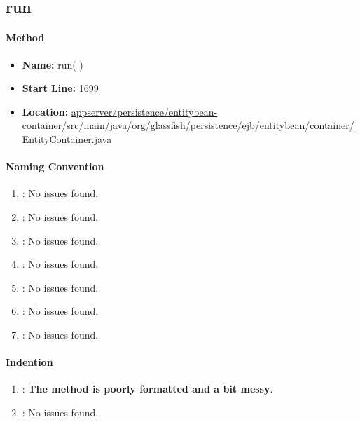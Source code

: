 \subsection{run} %
\label{sub:preinvokenotx}


\paragraph{Method}
\label{par:method}
\begin{itemize}
	\item \textbf{Name:} run( )
	\item \textbf{Start Line:} 1699
	\item \textbf{Location:} \url{appserver/persistence/entitybean-container/src/main/java/org/glassfish/persistence/ejb/entitybean/container/EntityContainer.java}
\end{itemize}


\paragraph{Naming Convention} %
\label{par:naming_convention}

\begin{enumerate}
	\item \emph{\checkA}: No issues found.
	\item \emph{\checkB}: No issues found.
	\item \emph{\checkC}: No issues found.
	\item \emph{\checkD}: No issues found.
	\item \emph{\checkE}: No issues found.
	\item \emph{\checkF}: No issues found.
	\item \emph{\checkG}: No issues found.
\end{enumerate}

\paragraph{Indention} %
\label{par:indention}

\begin{enumerate} [resume]
	\item \emph{\checkH}: \textbf{The method is poorly formatted and a bit messy}.
	\item \emph{\checkI}: No issues found.
\end{enumerate}

